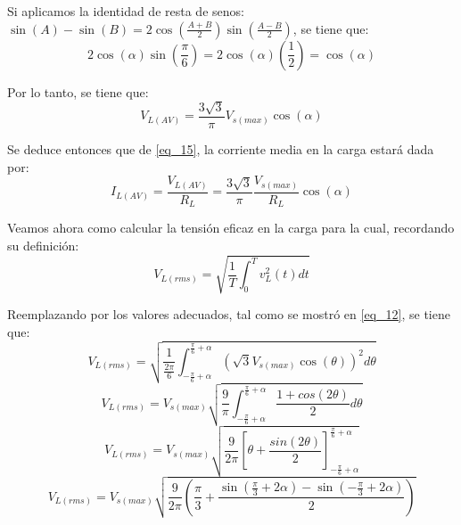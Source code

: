 \documentclass[12pt,a4paper]{article}
\begin{document}
Si aplicamos la identidad de resta de senos: $\sin(A) - \sin(B) = 2 \cos\left(\frac{A+B}{2}\right) \sin\left(\frac{A-B}{2}\right)$, se tiene que:
\begin{equation}
    2\cos(\alpha) \sin\left(\frac{\pi}{6}\right) = 2 \cos(\alpha) \left(\frac{1}{2}\right) = \cos(\alpha)
    \label{eq_15}
\end{equation}

Por lo tanto, se tiene que:
\begin{equation}
    V_{L(AV)} = \frac{3\sqrt{3}}{\pi} V_{s(max)} \cos(\alpha)
    \label{eq_16}
\end{equation}

Se deduce entonces que de \eqref{eq_15}, la corriente media en la carga estará dada por:
\begin{equation}
    I_{L(AV)} = \frac{V_{L(AV)}}{R_{L}} = \frac{3\sqrt{3}}{\pi} \frac{V_{s(max)}}{R_{L}} \cos(\alpha)
    \label{eq_17}
\end{equation}

Veamos ahora como calcular la tensión eficaz en la carga para la cual, recordando su definición:
\begin{equation}
    V_{L(rms)} = \sqrt{\frac{1}{T} \int_{0}^{T} v_{L}^{2}(t) dt}
    \label{eq_18}
\end{equation}

Reemplazando por los valores adecuados, tal como se mostró en \eqref{eq_12}, se tiene que:
\begin{equation}
    V_{L(rms)} = \sqrt{\frac{1}{\frac{2\pi}{6}} \int_{-\frac{\pi}{6} + \alpha}^{\frac{\pi}{6} + \alpha} (\sqrt{3} V_{s(max)} \cos(\theta))^{2} d\theta}
    \label{eq_19}
\end{equation}
\begin{equation}
    V_{L(rms)} = V_{s(max)} \sqrt{\frac{9}{\pi} \int_{-\frac{\pi}{6} + \alpha}^{\frac{\pi}{6} + \alpha} \frac{1+cos(2\theta)}{2} d\theta}
    \label{eq_20}
\end{equation}
\begin{equation}
    V_{L(rms)} = V_{s(max)} \sqrt{\frac{9}{2\pi} \left[\theta+\frac{sin(2\theta)}{2}\right]_{-\frac{\pi}{6} + \alpha}^{\frac{\pi}{6} + \alpha}}
    \label{eq_21}
\end{equation}
\begin{equation}
    V_{L(rms)} = V_{s(max)} \sqrt{\frac{9}{2\pi} \left(\frac{\pi}{3} + \frac{\sin(\frac{\pi}{3} + 2\alpha) - \sin(-\frac{\pi}{3} + 2\alpha)}{2}\right)}
    \label{eq_22}
\end{equation}
\end{document}
